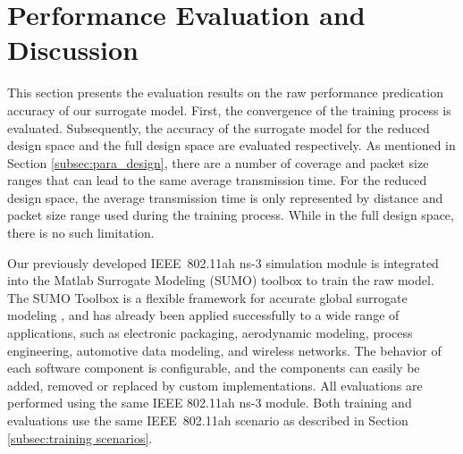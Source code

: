\section{Performance Evaluation and Discussion \label{sec:evaluation}}

This section presents the evaluation results on the \gls{raw} performance predication accuracy of our surrogate model. First, the  convergence of the training process is evaluated. Subsequently, the accuracy of the surrogate model for the reduced design space and the full design space are evaluated respectively. 
As mentioned in Section \ref{subsec:para_design}, there are a number of coverage and packet size ranges that can lead to the same average transmission time. For the reduced design space, the average transmission time is only represented by distance and packet size range used during the training process. While in the full design space, there is no such limitation.


Our previously developed IEEE~802.11ah ns-3 simulation module \cite{WNS32016} is integrated into the Matlab Surrogate Modeling (SUMO) toolbox to train the \gls{raw} model. The SUMO Toolbox is a flexible framework for accurate global surrogate modeling \cite{SUMOtoolbox2010}, and has already been applied successfully to a wide range of applications, such as electronic packaging, aerodynamic modeling, process engineering, automotive data modeling, and wireless networks. The behavior of each software component is configurable, and the components can easily be added, removed or replaced by custom implementations. All evaluations are performed using the same IEEE 802.11ah ns-3 module. Both training and evaluations use the same IEEE~802.11ah scenario as described in Section \ref{subsec:training scenarios}. 



